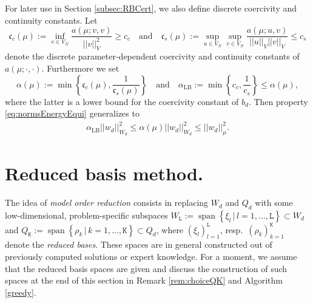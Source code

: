 \documentclass{article}
\theoremstyle{plain}
\theoremstyle{definition}
\theoremstyle{remark}
\DeclareMathOperator{\Span}{span}
\begin{document}
For later use in Section \ref{subsec:RBCert}, we also define discrete coercivity and continuity constants. Let 
\begin{equation}
    \mathfrak{c}_c(\mu) := \underset{v \in V_N}{\inf} \frac{a(\mu; v,v)}{\vert \vert v \vert \vert^2_V} \geq c_c \quad \text{and} \quad \mathfrak{c}_s(\mu) := \underset{u \in V_N}{\sup} \underset{v \in V_N}{\sup} \frac{a(\mu; u,v)}{\vert \vert u \vert \vert_V \vert \vert v \vert \vert_V} \leq c_s
\end{equation}
denote the discrete parameter-dependent coercivity and continuity constants of $a(\mu; \cdot, \cdot)$. Furthermore we set
\begin{equation}
    \alpha(\mu) := \min\left\lbrace \mathfrak{c}_c(\mu),\frac{1}{\mathfrak{c}_s(\mu)}\right\rbrace \quad \text{and} \quad  \alpha_{\text{LB}} := \min\left\lbrace c_c,\frac{1}{c_s}\right\rbrace \leq \alpha(\mu) ,
\end{equation}
where the latter is a lower bound for the coercivity constant of $b_d$. Then property \eqref{eq:normsEnergyEqui} generalizes to
\begin{align}\label{eq:normsEnergyEqui2}
    \alpha_{\text{LB}} \vert \vert w_d \vert \vert_{W_d}^2 \leq \alpha(\mu) \vert \vert w_d \vert \vert_{W_d}^2 \leq \vert \vert w_d \vert \vert_\mu^2 .
\end{align}

\section{Reduced basis method.}\label{sec:RB}
The idea of \textit{model order reduction} consists in replacing $W_d$ and $Q_d$ with some low-dimensional, problem-specific subspaces $W_{\texttt{L}} := \Span \left\lbrace \xi_{l} \, \vert \, l = 1, ..., \texttt{L}\right\rbrace \subset W_d$ and $Q_{\texttt{K}} := \Span \left\lbrace \rho_{k} \, \vert \, k = 1, ..., \texttt{K}\right\rbrace \subset Q_d$, where $(\xi_{l})_{l=1}^{\texttt{L}}$, resp.~$(\rho_{k})_{k=1}^{\texttt{K}}$ denote the \textit{reduced bases}. These spaces are in general constructed out of previously computed solutions or expert knowledge. For a moment, we assume that the reduced basis spaces are given and discuss the construction of such spaces at the end of this section in Remark \ref{rem:choiceQK} and Algorithm \ref{greedy}.
\end{document}

